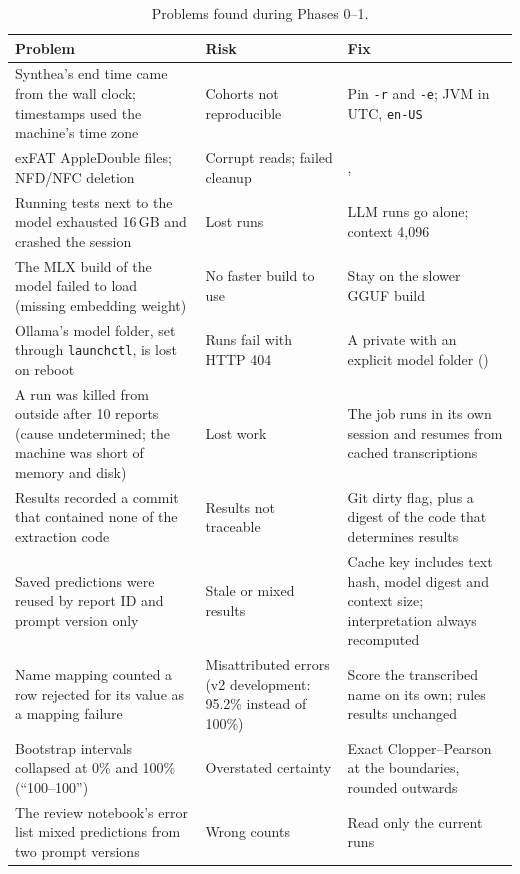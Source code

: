 \documentclass[11pt,a4paper]{article}
\newcommand{\code}[1]{\texttt{\detokenize{#1}}}
\begin{document}
\begin{table}[h]
\centering\footnotesize
\begin{tabularx}{\linewidth}{@{}>{\raggedright\arraybackslash}p{4.4cm}>{\raggedright\arraybackslash}X>{\raggedright\arraybackslash}p{4.2cm}@{}}
\toprule
Problem & Risk & Fix \\
\midrule
Synthea's end time came from the wall clock; timestamps used the machine's time zone & Cohorts not reproducible & Pin \texttt{-r} and \texttt{-e}; JVM in UTC, \texttt{en-US} \\
exFAT AppleDouble files; NFD/NFC deletion & Corrupt reads; failed cleanup & \code{iter_data_files}, \code{remove_tree} \\
Running tests next to the model exhausted 16\,GB and crashed the session & Lost runs & LLM runs go alone; context 4,096 \\
The MLX build of the model failed to load (missing embedding weight) & No faster build to use & Stay on the slower GGUF build \\
Ollama's model folder, set through \texttt{launchctl}, is lost on reboot & Runs fail with HTTP 404 & A private \code{ollama serve} with an explicit model folder (\code{make extract-llm}) \\
A run was killed from outside after 10 reports (cause undetermined; the machine was short of memory and disk) & Lost work & The job runs in its own session and resumes from cached transcriptions \\
Results recorded a commit that contained none of the extraction code & Results not traceable & Git dirty flag, plus a digest of the code that determines results \\
Saved predictions were reused by report ID and prompt version only & Stale or mixed results & Cache key includes text hash, model digest and context size; interpretation always recomputed \\
Name mapping counted a row rejected for its value as a mapping failure & Misattributed errors (v2 development: 95.2\% instead of 100\%) & Score the transcribed name on its own; rules results unchanged \\
Bootstrap intervals collapsed at 0\% and 100\% (``100--100'') & Overstated certainty & Exact Clopper--Pearson at the boundaries, rounded outwards \\
The review notebook's error list mixed predictions from two prompt versions & Wrong counts & Read only the current runs \\
\bottomrule
\end{tabularx}
\caption{Problems found during Phases 0--1.}
\end{table}
\end{document}
